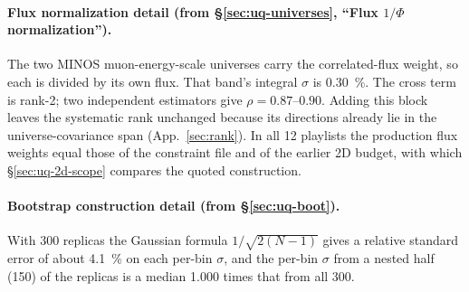 \paragraph{Flux normalization detail (from \S\ref{sec:uq-universes}, ``Flux $1/\Phi$ normalization'').} The two MINOS muon-energy-scale universes carry the correlated-flux weight, so each is divided by its own flux. That band's integral $\sigma$ is \SI{0.30}{\percent}. The cross term is rank-2; two independent estimators give $\rho=0.87$--$0.90$. Adding this block leaves the systematic rank unchanged because its directions already lie in the universe-covariance span (App.~\ref{sec:rank}). In all 12 playlists the production flux weights equal those of the constraint file and of the earlier 2D budget, with which \S\ref{sec:uq-2d-scope} compares the quoted construction.

\paragraph{Bootstrap construction detail (from \S\ref{sec:uq-boot}).} With 300 replicas the Gaussian formula $1/\sqrt{2(N-1)}$ gives a relative standard error of about \SI{4.1}{\percent} on each per-bin $\sigma$, and the per-bin $\sigma$ from a nested half (150) of the replicas is a median 1.000 times that from all 300.


